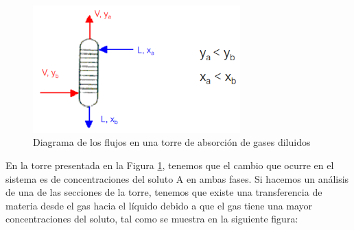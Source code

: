 \documentclass[11pt]{book}
\begin{document}
\begin{figure}[H]
    \centering
    \includegraphics[width = 8cm]{img/absorcion/Absorcion_5.PNG}
    \caption{Diagrama de los flujos en una torre de absorción de gases diluidos}
    \label{fig:Absorcion_5}
\end{figure}

En la torre presentada en la Figura \ref{fig:Absorcion_5}, tenemos que el cambio que ocurre en el sistema es de concentraciones del soluto A en ambas fases. Si hacemos un análisis de una de las secciones de la torre, tenemos que existe una transferencia de materia desde el gas hacia el líquido debido a que el gas tiene una mayor concentraciones del soluto, tal como se muestra en la siguiente figura:
\end{document}
